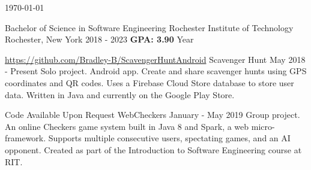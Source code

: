 \documentclass{awesome-cv}
\begin{document}
	\makecvheader[C]

	\makecvfooter
		{}
		{}
		{\today}


		\begin{cventries}
			\cventry
				{Bachelor of Science in Software Engineering}
				{Rochester Institute of Technology}
				{Rochester, New York}
				{2018 - 2023}
                {\textbf{GPA: 3.90}  Year}
		\end{cventries}

	\cvsection{PROJECTS}
		\begin{cventries}
			\cventry
				{\href{https://github.com/Bradley-B/ScavengerHuntAndroid}{https://github.com/Bradley-B/ScavengerHuntAndroid}}
				{Scavenger Hunt}
				{May 2018 - Present}
				{}
				{Solo project. Android app. Create and share scavenger hunts using GPS coordinates and QR codes. Uses a Firebase Cloud Store database to store user data. Written in Java and currently on the Google Play Store.}

			\cventry
				{Code Available Upon Request}
				{WebCheckers}
				{January - May 2019}
				{}
				{Group project. An online Checkers game system built in Java 8 and Spark, a web micro-framework. Supports multiple consecutive users, spectating games, and an AI opponent. Created as part of the Introduction to Software Engineering course at RIT.}


		\end{cventries}
\end{document}
